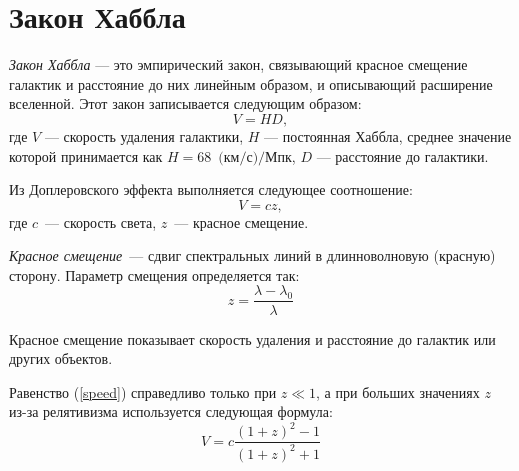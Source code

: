 \section{Закон Хаббла}
\textit{Закон Хаббла} --- это эмпирический закон, связывающий красное смещение галактик и расстояние до них линейным образом, и описывающий расширение вселенной. Этот закон записывается следующим образом:
\begin{equation}
V=HD,
\end{equation}
где $V$ --- скорость удаления галактики, $H$ --- постоянная Хаббла, среднее значение которой принимается как $H=68$~$\text{(км/с)}/\text{Мпк}$, $D$ --- расстояние до галактики. 

Из Доплеровского эффекта выполняется следующее соотношение:
\begin{equation}
V=cz,
\end{equation}\label{speed}
где $c$~--- скорость света, $z$~--- красное смещение.

\textit{Красное смещение}~--- сдвиг спектральных линий в длинноволновую (красную) сторону. Параметр смещения определяется так:
\begin{equation}
z=\frac{\lambda-\lambda_0}{\lambda}
\end{equation}

Красное смещение показывает скорость удаления и расстояние до галактик или других объектов.

Равенство (\ref{speed})  справедливо только при $z\ll1$, а при больших значениях $z$ из-за релятивизма используется следующая формула:
\begin{equation}
V=c\frac{(1+z)^2-1}{(1+z)^2+1}
\end{equation}